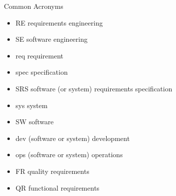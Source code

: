 
\begin{Slide}{Common Acronyms}

\begin{itemize}
\item RE   \hfill requirements engineering
\item SE   \hfill software engineering
\item req  \hfill requirement 
\item spec \hfill specification
\item SRS  \hfill software (or system) requirements specification
\item sys  \hfill system
\item SW   \hfill software
\item dev  \hfill (software or system) development
\item ops  \hfill (software or system) operations
\item FR   \hfill quality requirements
\item QR   \hfill functional requirements



\end{itemize}
\end{Slide}

